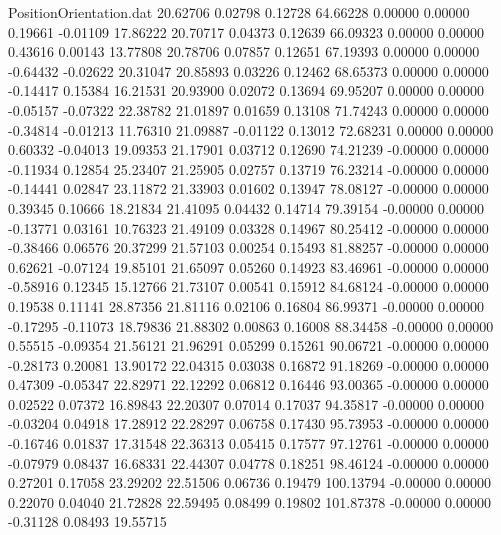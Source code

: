 \begin{filecontents}{PositionOrientation.dat}
  20.62706    0.02798    0.12728    64.66228    0.00000    0.00000    0.19661   -0.01109   17.86222
  20.70717    0.04373    0.12639    66.09323    0.00000    0.00000    0.43616    0.00143   13.77808
  20.78706    0.07857    0.12651    67.19393    0.00000    0.00000   -0.64432   -0.02622   20.31047
  20.85893    0.03226    0.12462    68.65373    0.00000    0.00000   -0.14417    0.15384   16.21531
  20.93900    0.02072    0.13694    69.95207    0.00000    0.00000   -0.05157   -0.07322   22.38782
  21.01897    0.01659    0.13108    71.74243    0.00000    0.00000   -0.34814   -0.01213   11.76310
  21.09887   -0.01122    0.13012    72.68231    0.00000    0.00000    0.60332   -0.04013   19.09353
  21.17901    0.03712    0.12690    74.21239   -0.00000    0.00000   -0.11934    0.12854   25.23407
  21.25905    0.02757    0.13719    76.23214   -0.00000    0.00000   -0.14441    0.02847   23.11872
  21.33903    0.01602    0.13947    78.08127   -0.00000    0.00000    0.39345    0.10666   18.21834
  21.41095    0.04432    0.14714    79.39154   -0.00000    0.00000   -0.13771    0.03161   10.76323
  21.49109    0.03328    0.14967    80.25412   -0.00000    0.00000   -0.38466    0.06576   20.37299
  21.57103    0.00254    0.15493    81.88257   -0.00000    0.00000    0.62621   -0.07124   19.85101
  21.65097    0.05260    0.14923    83.46961   -0.00000    0.00000   -0.58916    0.12345   15.12766
  21.73107    0.00541    0.15912    84.68124   -0.00000    0.00000    0.19538    0.11141   28.87356
  21.81116    0.02106    0.16804    86.99371   -0.00000    0.00000   -0.17295   -0.11073   18.79836
  21.88302    0.00863    0.16008    88.34458   -0.00000    0.00000    0.55515   -0.09354   21.56121
  21.96291    0.05299    0.15261    90.06721   -0.00000    0.00000   -0.28173    0.20081   13.90172
  22.04315    0.03038    0.16872    91.18269   -0.00000    0.00000    0.47309   -0.05347   22.82971
  22.12292    0.06812    0.16446    93.00365   -0.00000    0.00000    0.02522    0.07372   16.89843
  22.20307    0.07014    0.17037    94.35817   -0.00000    0.00000   -0.03204    0.04918   17.28912
  22.28297    0.06758    0.17430    95.73953   -0.00000    0.00000   -0.16746    0.01837   17.31548
  22.36313    0.05415    0.17577    97.12761   -0.00000    0.00000   -0.07979    0.08437   16.68331
  22.44307    0.04778    0.18251    98.46124   -0.00000    0.00000    0.27201    0.17058   23.29202
  22.51506    0.06736    0.19479   100.13794   -0.00000    0.00000    0.22070    0.04040   21.72828
  22.59495    0.08499    0.19802   101.87378   -0.00000    0.00000   -0.31128    0.08493   19.55715

\end{filecontents}
